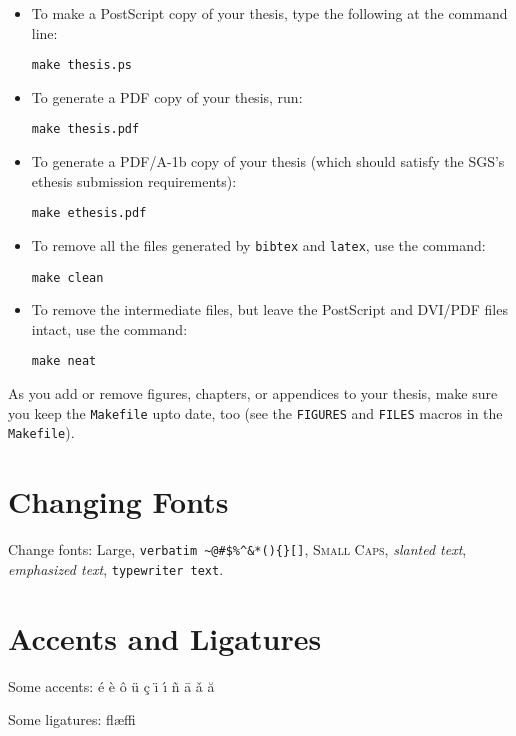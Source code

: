 \begin{itemize}
\item To make a PostScript copy of your thesis, type the following
at the command line:

\texttt{make thesis.ps}

\item To generate a PDF copy of your thesis, run:

\texttt{make thesis.pdf}

\item To generate a PDF/A-1b copy of your thesis (which should
satisfy the SGS's ethesis submission requirements):

\texttt{make ethesis.pdf}

\item To remove all the files generated by \texttt{bibtex} and
\texttt{latex}, use the command:

\texttt{make clean}

\item To remove the intermediate files, but leave the PostScript
and DVI/PDF files intact, use the command:

\texttt{make neat}
\end{itemize}

As you add or remove figures, chapters, or appendices to your thesis,
make sure you keep the \texttt{Makefile} upto date, too (see the
\texttt{FIGURES} and \texttt{FILES} macros in the \texttt{Makefile}).

\section{Changing Fonts}

Change fonts: {\Large Large},
\verb+verbatim ~@#$%^&*(){}[]+,
\textsc{Small Caps},
\textsl{slanted text},
\emph{emphasized text},
\texttt{typewriter text}.

\section{Accents and Ligatures}

Some accents:
\'{e}
\`{e}
\^{o}
\"{u}
\c{c}
\"{\i}
\'{\i}
\~{n}
\={a}
\v{a}
\u{a}

\noindent Some ligatures:
fl{\ae}ffi
